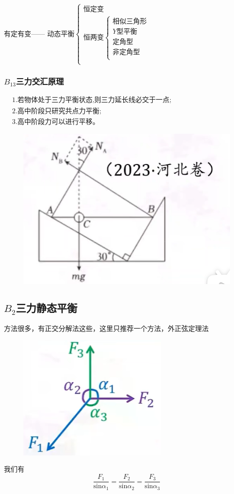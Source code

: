 \documentclass[lang=cn,10pt]{elegantbook}
\begin{document}
	有定有变——
$	\text{动态平衡}\begin{cases}
		\text{恒定变}\\
		\text{恒两变}\begin{cases}
			\text{相似三角形}\\
			Y\text{型平衡}\\
			\text{定角型}\\
			\text{非定角型}\\
		\end{cases}\\
	\end{cases}$
	\subsubsection{$B_{13}$三力交汇原理}
	$\begin{aligned}&1.\text{若物体处于三力平衡状态,则}\text{三力延长线必交于一点;}\\&\text{2.高中阶段只研究共点力平衡;}\\&\text{3.高中阶段力可以进行平移。}\end{aligned}$
	\begin{example}
		\begin{figure}[H]
			\centering
			\includegraphics[width=0.3\linewidth]{image/22}
		\end{figure}
	\end{example}
	\subsection{$B_{2}$三力静态平衡}
	方法很多，有正交分解法这些，这里只推荐一个方法，外正弦定理法
	\begin{figure}[H]
		\centering
		\includegraphics[width=0.3\linewidth]{image/23}
	\end{figure}
	我们有
	\begin{equation*}
		\frac{F_1}{\mathrm{sin}\alpha_1}=\frac{F_2}{\mathrm{sin}\alpha_2}=\frac{F_3}{\mathrm{sin}\alpha_3}
	\end{equation*}
	
\end{document}
